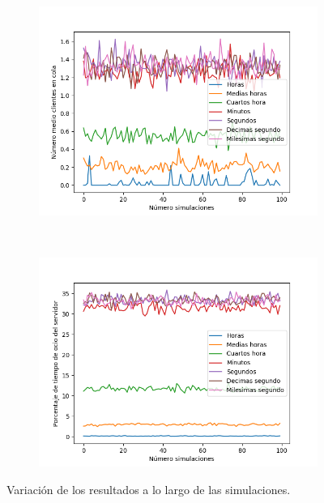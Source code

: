 \documentclass[11pt,a4paper]{article}
\begin{document}
\begin{figure}[H]
	\centering
	\begin{subfigure}{.5\textwidth}
		\includegraphics[scale=0.44]{img/fijo-q}
		\label{fig:fijo-q}
	\end{subfigure}%
	~
	\begin{subfigure}{.5\textwidth}
		\includegraphics[scale=0.44]{img/fijo-pto}
		\label{fig:fijo-pto}
	\end{subfigure}

	\caption{Variación de los resultados a lo largo de las simulaciones.}
	\label{fig:fijo}
\end{figure}
\end{document}
